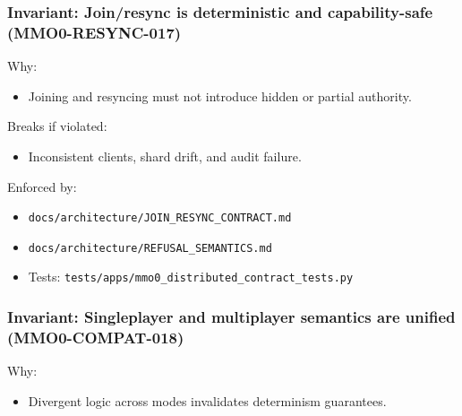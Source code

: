\documentclass[9pt,a4paper,openany]{book}
\begin{document}
\subsubsection{Invariant: Join/resync is deterministic and capability-safe (MMO0-RESYNC-017)}


Why:



\begin{itemize}
\item Joining and resyncing must not introduce hidden or partial authority.\allowbreak{}
\end{itemize}


Breaks if violated:



\begin{itemize}
\item Inconsistent clients, shard drift, and audit failure.\allowbreak{}
\end{itemize}


Enforced by:



\begin{itemize}
\item \texttt{docs/\allowbreak{}architecture/\allowbreak{}JOIN\_\allowbreak{}RESYNC\_\allowbreak{}CONTRACT.\allowbreak{}md}
\end{itemize}


\begin{itemize}
\item \texttt{docs/\allowbreak{}architecture/\allowbreak{}REFUSAL\_\allowbreak{}SEMANTICS.\allowbreak{}md}
\end{itemize}


\begin{itemize}
\item Tests: \texttt{tests/\allowbreak{}apps/\allowbreak{}mmo0\_\allowbreak{}distributed\_\allowbreak{}contract\_\allowbreak{}tests.\allowbreak{}py}
\end{itemize}





\subsubsection{Invariant: Singleplayer and multiplayer semantics are unified (MMO0-COMPAT-018)}


Why:



\begin{itemize}
\item Divergent logic across modes invalidates determinism guarantees.\allowbreak{}
\end{itemize}
\end{document}
